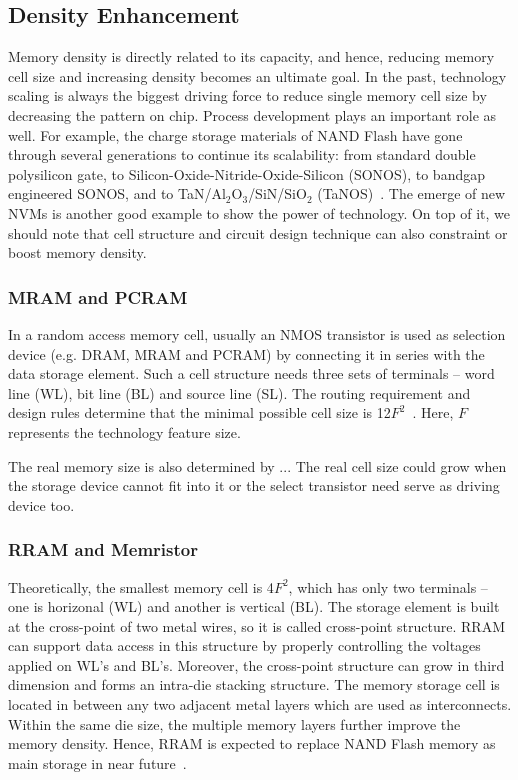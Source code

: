 \subsection{Density Enhancement}

Memory density is directly related to its capacity, and hence, reducing memory cell size and increasing density becomes an ultimate goal. In the past, technology scaling is always the biggest driving force to reduce single memory cell size by decreasing the pattern on chip. Process development plays an important role as well. For example, the charge storage materials of NAND Flash have gone through several generations to continue its scalability: from standard double polysilicon gate, to Silicon-Oxide-Nitride-Oxide-Silicon (SONOS), to bandgap engineered SONOS, and to TaN/Al$_2$O$_3$/SiN/SiO$_2$ (TaNOS)~\cite{Lu09}. The emerge of new NVMs is another good example to show the power of technology. On top of it, we should note that cell structure and circuit design technique can also constraint or boost memory density.

\subsubsection{MRAM and PCRAM}

In a random access memory cell, usually an NMOS transistor is used as selection device (e.g. DRAM, MRAM and PCRAM) by connecting it in series with the data storage element. Such a cell structure needs three sets of terminals -- word line (WL), bit line (BL) and source line (SL). The routing requirement and design rules determine that the minimal possible cell size is 12$F^2$~\cite{Li09}. Here, $F$ represents the technology feature size. 

The real memory size is also determined by ...
The real cell size could grow when the storage device cannot fit into it or the select transistor need serve as driving device too.



\subsubsection{RRAM and Memristor}

Theoretically, the smallest memory cell is 4$F^2$, which has only two terminals -- one is horizonal (WL) and another is vertical (BL). The storage element is built at the cross-point of two metal wires, so it is called cross-point structure. RRAM can support data access in this structure by properly controlling the voltages applied on WL's and BL's. Moreover, the cross-point structure can grow in third dimension and forms an intra-die stacking structure. The memory storage cell is located in between any two adjacent metal layers which are used as interconnects. Within the same die size, the multiple memory layers further improve the memory density. Hence, RRAM is expected to replace NAND Flash memory as main storage in near future~\cite{ITRS07}.

